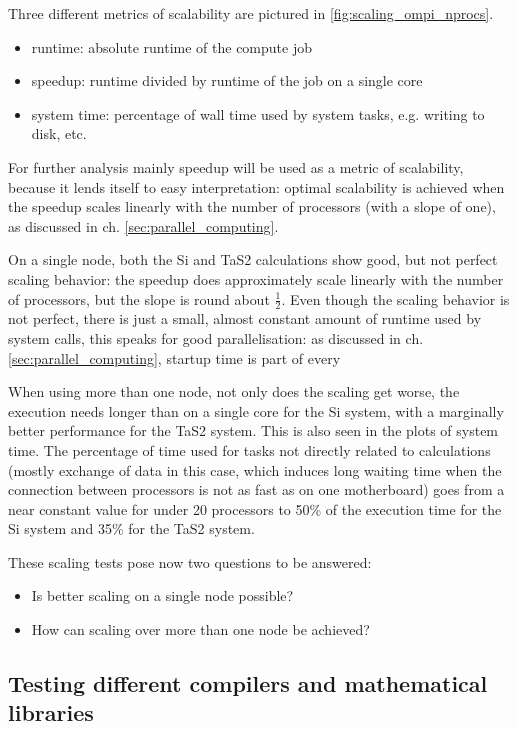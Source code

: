 \documentclass[main.tex]{subfiles}
\begin{document}

Three different metrics of scalability are pictured in \ref{fig:scaling_ompi_nprocs}.
\begin{itemize}
    \item runtime: absolute runtime of the compute job
    \item speedup: runtime divided by runtime of the job on a single core
    \item system time: percentage of wall time used by system tasks, e.g. writing to disk, etc.
\end{itemize}
For further analysis mainly speedup will be used as a metric of scalability, because it lends itself to easy interpretation: optimal scalability is achieved when the speedup scales linearly with the number of processors (with a slope of one), as discussed in ch. \ref{sec:parallel_computing}.

On a single node, both the Si and TaS2 calculations show good, but not perfect scaling behavior: the speedup does approximately scale linearly with the number of processors, but the slope is round about \(\frac{1}{2}\).
Even though the scaling behavior is not perfect, there is just a small, almost constant amount of runtime used by system calls, this speaks for good parallelisation: as discussed in ch. \ref{sec:parallel_computing}, startup time is part of every 

When using more than one node, not only does the scaling get worse, the execution needs longer than on a single core for the Si system, with a marginally better performance for the TaS2 system.
This is also seen in the plots of system time. The percentage of time used for tasks not directly related to calculations (mostly exchange of data in this case, which induces long waiting time when the connection between processors is not as fast as on one motherboard) goes from a near constant value for under 20 processors to 50\% of the execution time for the Si system and 35\% for the TaS2 system.

These scaling tests pose now two questions to be answered:
\begin{itemize}
    \item Is better scaling on a single node possible?
    \item How can scaling over more than one node be achieved?
\end{itemize}

\subsection{Testing different compilers and mathematical libraries}
\end{document}

